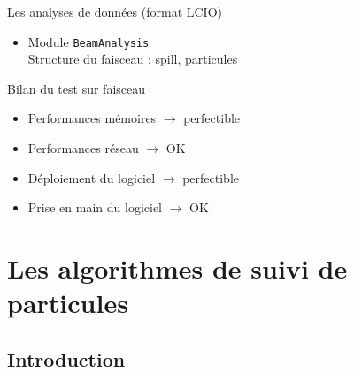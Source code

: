 \documentclass[8pt]{beamer}
\begin{document}
\begin{frame}
\begin{block}{Les analyses de données (format LCIO)}
\begin{minipage}{0.49\linewidth}
        \end{minipage}
        \begin{itemize}
          \item Module \texttt{BeamAnalysis} \\ Structure du faisceau : spill, particules
        \end{itemize}
      \end{block}
      \pause
      \begin{block}{Bilan du test sur faisceau}
        \begin{minipage}{0.49\linewidth}
          \begin{itemize}
            \item Performances mémoires $\rightarrow$ perfectible
            \item Performances réseau $\rightarrow$ OK
          \end{itemize}
        \end{minipage} \hfill
        \begin{minipage}{0.49\linewidth}
          \begin{itemize}
            \item Déploiement du logiciel $\rightarrow$ perfectible
            \item Prise en main du logiciel $\rightarrow$ OK
          \end{itemize}
        \end{minipage}
      \end{block}
    \end{frame}







  \section{Les algorithmes de suivi de particules}

  \begin{frame}
  \frametitle{\secname}
    \tableofcontents[currentsection]
  \end{frame}

  \subsection{Introduction}
\end{document}
